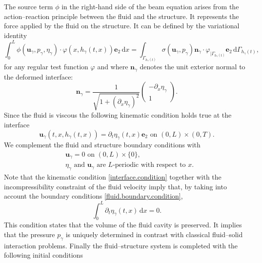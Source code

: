 \documentclass[10pt]{amsart}
\theoremstyle{remark}
\theoremstyle{definition}
\newcommand{\ug}{\boldsymbol{u}}
\newcommand{\dd}{\,\mathrm{d}}
\newcommand{\normal}{\BS{n}}
\newcommand{\BS}[1]{\boldsymbol{#1}}
\begin{document}
The source term $\phi$ in the right-hand side of the beam equation arises from the action--reaction principle between the fluid and the structure. It represents the force applied by the fluid on the structure. It can be defined by the variational identity
\begin{equation}
\label{def:forcefluide}
\int_{0}^{L}\phi(\ug_{\gamma},p_{\gamma},\eta_{\gamma})\cdot \varphi(x,h_{\gamma}(t,x))\BS{e}_{2}\dd x=\int_{\Gamma_{h_{\gamma}(t)}}\sigma(\ug_{\gamma},p_{\gamma})\normal_{\gamma}\cdot \varphi_{\vert \Gamma_{h_{\gamma}(t)}}\BS{e}_{2}\dd \Gamma_{h_{\gamma}(t)},
\end{equation}
for any regular test function $\varphi$ and where $\normal_{\gamma}$ denotes the unit exterior normal to the deformed interface:\vspace*{-3pt}
\[
\normal_{\gamma}=\frac{1}{\sqrt{1+(\partial_{x}\eta_{\gamma})^{2}}}\begin{pmatrix}
-\partial_{x}\eta_{\gamma}\\
1
\end{pmatrix}.
\]
Since the fluid is viscous the following kinematic condition holds true at the interface%
\begin{equation}\label{interface.condition}
\ug_{\gamma}(t,x,h_\gamma(t,x))=\partial_{t}\eta_{\gamma}(t,x)\BS{e}_{2}\text{ on } (0, L)\times (0, T).
\end{equation}
We complement the fluid and structure boundary conditions with
\begin{equation}\label{fluid.boundary.condition}
\begin{aligned}
&\ug_{\gamma}=0\text{ on }(0,L)\times \{0\},\\
&\eta_{\gamma}\text{ and }\ug_{\gamma}\text{ are }L\text{-periodic with respect to }x.
\end{aligned}
\end{equation}
Note that the kinematic condition \eqref{interface.condition} together with the incompressibility constraint of the fluid velocity imply that, by taking into account the boundary conditions \eqref{fluid.boundary.condition},%
\begin{equation}\label{compatibilite-vitesse-structure}
\int_0^L\partial_t \eta_\gamma(t,x) \dd x =0.
\end{equation}
This condition states that the volume of the fluid cavity is preserved.
It implies that the pressure $p_{\gamma}$ is uniquely determined in contrast with classical fluid--solid interaction problems.
Finally the fluid--structure system is completed with the following initial conditions
\end{document}
